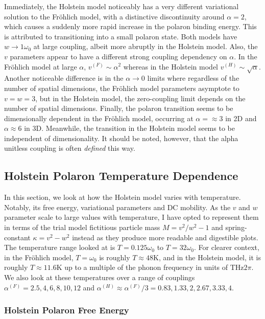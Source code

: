 Immediately, the Holstein model noticeably has a very different variational solution to the Fr\"ohlich model, with a distinctive discontinuity around $\alpha = 2$, which causes a suddenly more rapid increase in the polaron binding energy. This is attributed to transitioning into a small polaron state. Both models have $w \to 1 \omega_0$ at large coupling, albeit more abruptly in the Holstein model. Also, the $v$ parameters appear to have a different strong coupling dependency on $\alpha$. In the Fr\"ohlich model at large $\alpha$, $v^{(F)} \sim \alpha^2$ whereas in the Holstein model $v^{(H)} \sim \sqrt{\alpha}$. Another noticeable difference is in the $\alpha \to 0$ limits where regardless of the number of spatial dimensions, the Fr\"ohlich model parameters asymptote to $v = w = 3$, but in the Holstein model, the zero-coupling limit depends on the number of spatial dimensions. Finally, the polaron transition seems to be dimensionally dependent in the Fr\"ohlich model, occurring at $\alpha = \approx 3$ in 2D and $\alpha \approx 6$ in 3D. Meanwhile, the transition in the Holstein model seems to be independent of dimensionality. It should be noted, however, that the alpha unitless coupling is often \emph{defined} this way.

\subsection{Holstein Polaron Temperature Dependence}

In this section, we look at how the Holstein model varies with temperature. Notably, its free energy, variational parameters and DC mobility. As the $v$ and $w$ parameter scale to large values with temperature, I have opted to represent them in terms of the trial model fictitious particle mass $M = v^2 / w^2 - 1$ and spring-constant $\kappa = v^2 - w^2$ instead as they produce more readable and digestible plots. The temperature range looked at is $T = 0.125 \omega_0$ to $T = 32 \omega_0$. For clearer context, in the Fr\"ohlich model, $T = \omega_0$ is roughly $T \approx 48 $K, and in the Holstein model, it is roughly $T \approx 11.6 $K up to a multiple of the phonon frequency in units of THz$2\pi$. We also look at these temperatures over a range of couplings $\alpha^{(F)} = 2.5, 4, 6, 8, 10, 12$ and $\alpha^{(H)} \approx \alpha^{(F)} / 3 = 0.83, 1.33, 2, 2.67, 3.33, 4$.

\subsubsection{Holstein Polaron Free Energy}

